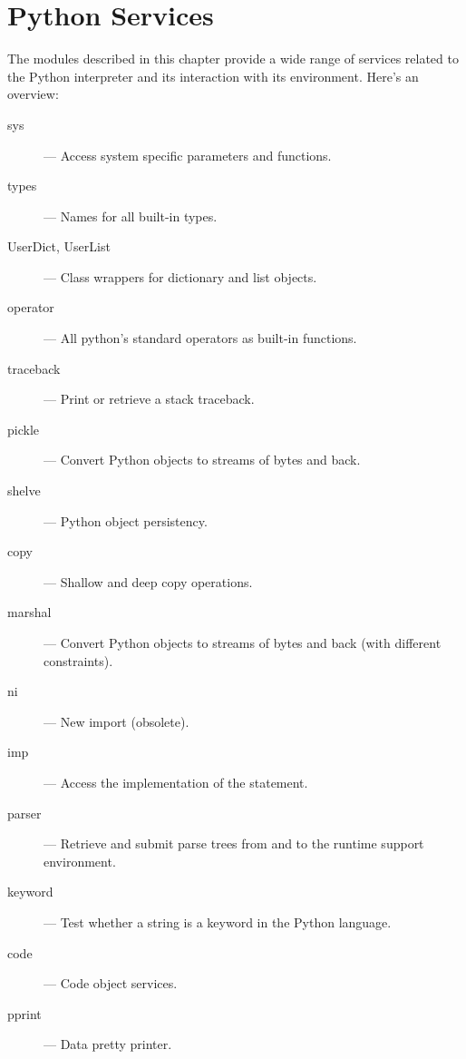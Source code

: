 \chapter{Python Services}

The modules described in this chapter provide a wide range of services
related to the Python interpreter and its interaction with its
environment.  Here's an overview:

\begin{description}

\item[sys]
--- Access system specific parameters and functions.

\item[types]
--- Names for all built-in types.

\item[UserDict, UserList]
--- Class wrappers for dictionary and list objects.

\item[operator]
--- All python's standard operators as built-in functions.

\item[traceback]
--- Print or retrieve a stack traceback.

\item[pickle]
--- Convert Python objects to streams of bytes and back.

\item[shelve]
--- Python object persistency.

\item[copy]
--- Shallow and deep copy operations.

\item[marshal]
--- Convert Python objects to streams of bytes and back (with
different constraints).

\item[ni]
--- New import (obsolete).

\item[imp]
--- Access the implementation of the  statement.

\item[parser]
--- Retrieve and submit parse trees from and to the runtime support
environment.

\item[keyword]
--- Test whether a string is a keyword in the Python language.

\item[code]
--- Code object services.

\item[pprint]
--- Data pretty printer.


\end{description}
